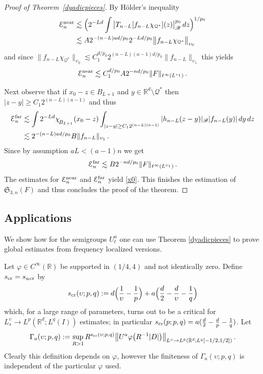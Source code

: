 \documentclass[11pt]{amsart}
\theoremstyle{definition}
\numberwithin{theorem}{section}
\numberwithin{definition}{section}
\renewcommand{\wp}{\upsilon}
\def\scr{{s_{{\text{\rm cr}}}}}
\def\Ennear{{\mathcal E_n^{\text{\rm near}}} }
\def\Enfar{{\mathcal E_n^{\text{\rm far}}} }
\newcommand{\ci}[1]{_{{}_{\!\scriptstyle{#1}}}}
\newcommand{\Be}{\begin{equation}}
\newcommand{\Ee}{\end{equation}}
\newcommand{\R}{\mathbb{R}}
\newcommand{\Z}{\mathbb{Z}}
\newcommand{\note}[1]{\footnote{\texttt{\Small #1}}}
\def\R{\mathbb R}
\def\sB{{\mathscr{B}}}
\def\lc{\lesssim}
\def\fS{{\mathfrak {S}}}
\def\bbR{{\mathbb {R}}}
\def\cQ{{\mathcal {Q}}}
\begin{document}
\begin{proof}[Proof of Theorem~\ref{dyadicpieces}]
By H\"older's inequality
\begin{align*}\Ennear&\lc
\Big(2^{-Ld}\int \big| T_{n-L} [f_{n-L}\chi_{ \cQ^*}](z)\big|_{\sB}^{p_0} \,
dz\Big)^{1/p_0}
\\
&\lc A 2^{-(n-L)ad/{p_0}}
2^{-Ld/p_0}\big\|f_{n-L}\chi_{ \cQ^*}\big\|_{\wp_0}
\end{align*}
and since $\|f_{n-L}\chi_{ \cQ^*}\|_{\wp_0} \lc
C_1^{d/p_0} 2^{(n-L)(a-1)d/p_0}\|f_{n-L}\|_{\wp_1} $
this yields
$$
\Ennear \lc C_1^{d/p_0}
A 2^{-nd/{p_0}}
\|F\|_{\ell^\infty(L^{\wp_1})}\,.
$$

Next observe that if $x_0-z\in B_{L+1}$ and $y\in \bbR^d\setminus \cQ^*$
then $|z-y|\ge C_1 2^{(n-L)(a-1)}$ and thus
\begin{align*}
\Enfar &\lc
\int
2^{-Ld}\chi\ci{B_{L+1}}(x_0-z)
\int_{|z-y|\ge C_1 2^{(n-L)(a-1)}}|h_{n-L}(z-y)|_\sB|f_{n-L}(y)|\,dy\, dz
\\
 &\lc 2^{-(n-L)ad/p_0}B\|f_{n-L}\|_{\wp_1}\,.
\end{align*}
Since by assumption  $aL<(a-1)n$ we get
$$\Enfar \lc
B 2^{-nd/{p_0}} \|F\|_{\ell^\infty(L^{\wp_1})}\,.$$
The estimates for $\Ennear$ and $\Enfar$ yield
\eqref{x0}. This finishes the estimation of $\fS_{3,n}(F)$ and thus concludes the proof of the theorem.


\end{proof}

\subsection*{\bf Applications}
We show how for the semigroups $U^a_t$ one can use Theorem
\ref{dyadicpieces} to prove global estimates from frequency
localized versions.



Let
 $\varphi\in C^\infty(\bbR)$ be supported in $(1/4,4)$ and not identically zero.
Define $\scr=s_{a\!,\text{cr}}$ by \Be\label{scr}\scr(\wp;p,q) :=
d\Big(\frac 1{\wp}-\frac 1p\Big)+a\Big(\frac d2-\frac d{\wp}-\frac
1q\Big) \Ee which, for a large range of parameters, turns out to be
a critical for $L^\wp_s\to L^p(\R^d;L^q(I))$ estimates; in
particular $\scr(p;p,q) = a(\frac d2-\frac d{p}-\frac 1q)$. Let
\Be\label{Gammadef} \Gamma_a(\wp;p,q) :=\sup_{R>1} R^{\scr(\wp;p,q)}
\big\|U^a \varphi \big(R^{-1}|D|\big)\big\|_{L^\wp\to
L^p(\R^d;L^q[-1/2,1/2])}\,.
\Ee
Clearly this definition depends on $\varphi$, however the finiteness of
$\Gamma_a(\wp;p,q)$ is independent of the particular $\varphi$ used.
\end{document}
